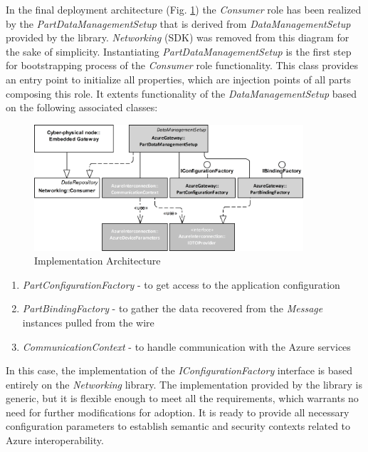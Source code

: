 \documentclass{jacsart}
\begin{document}

In the final deployment architecture (Fig. \ref*{figure4.ImplementationArchitecture}) the \textit{Consumer} role has been realized by the \textit{PartDataManagementSetup} that is derived from \textit{DataManagementSetup} provided by the library. \textit{Networking} (SDK) was removed from this diagram for the sake of simplicity. Instantiating \textit{PartDataManagementSetup} is the first step for bootstrapping process of the \textit{Consumer} role functionality. This class provides an entry point to initialize all properties, which are injection points of all parts composing this role. It extents functionality of the \textit{DataManagementSetup} based on the following associated classes:


\begin{figure}
      \centering
      \includegraphics[width=10cm]{../.Media/ImplementationArchitecture.png}
      \caption{Implementation Architecture}\label{figure4.ImplementationArchitecture}
\end{figure}

\begin{enumerate}
      \item \textit{PartConfigurationFactory} - to get access to the application configuration
      \item \textit{PartBindingFactory} - to gather the data recovered from the \textit{Message} instances pulled from the wire
      \item \textit{CommunicationContext} - to handle communication with the Azure services
\end{enumerate}

In this case, the implementation of the \textit{IConfigurationFactory} interface is based entirely on the \textit{Networking} library. The implementation provided by the library is generic, but it is flexible enough to meet all the requirements, which warrants no need for further modifications for adoption. It is ready to provide all necessary configuration parameters to establish semantic and security contexts related to Azure interoperability.
\end{document}
